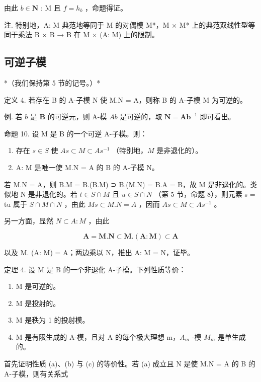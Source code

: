 由此 \(b \in \mathbf{N}\) : M 且 \(f = h_b\) ，命题得证。

注. 特别地，A: M 典范地等同于 M 的对偶模 M*，M × M* 上的典范双线性型等同于乘法 B × B → B 在 M × (A: M) 上的限制。

\subsection{可逆子模}

*（我们保持第 5 节的记号。）*

定义 4. 若存在 B 的 A-子模 N 使 M.N = A，则称 B 的 A-子模 M 为可逆的。

例. 若 \(b\) 是 \(\mathbf{B}\) 的可逆元，则 A-模 \(Ab\) 是可逆的，取 \(\mathbf{N} = \mathbf{Ab}^{-1}\) 即可看出。

命题 10. 设 M 是 B 的一个可逆 A-子模。则：

\begin{enumerate}
\def\labelenumi{(\roman{enumi})}
\item
  存在 \(s \in S\) 使 \(As \subset M \subset As^{-1}\) （特别地，\(M\) 是非退化的）。
\item
  A: M 是唯一使 M.N = A 的 B 的 A-子模 N。
\end{enumerate}

若 M.N = A，则 B.M = B.(B.M) ⊃ B.(M.N) = B.A = B，故 M 是非退化的。类似地 N 是非退化的。若 \(t \in S \cap M\) 且 \(u \in S \cap N\) （第 5 节，命题 8），则元素 s = tu 属于 \(S \cap M \cap N\) ，由此 \(Ms \subset M.N = A\) ，因而 \(As \subset M \subset As^{-1}\) 。

另一方面，显然 \(N \subset A: M\) ，由此

\[
\mathbf {A} = \mathbf {M}. \mathbf {N} \subset \mathbf {M}. (\mathbf {A}: \mathbf {M}) \subset \mathbf {A}
\]

以及 M. (A: M) = A；两边乘以 N，推出 A: M = N，证毕。

定理 4. 设 M 是 B 的一个非退化 A-子模。下列性质等价：

\begin{enumerate}
\def\labelenumi{(\alph{enumi})}
\item
  M 是可逆的。
\item
  M 是投射的。
\item
  M 是秩为 1 的投射模。
\item
  M 是有限生成的 A-模，且对 A 的每个极大理想 m，\(A_{m}\) -模 \(M_{m}\) 是单生成的。
\end{enumerate}

首先证明性质 (a)、(b) 与 (c) 的等价性。若 (a) 成立且 N 是使 M.N = A 的 B 的 A-子模，则有关系式

